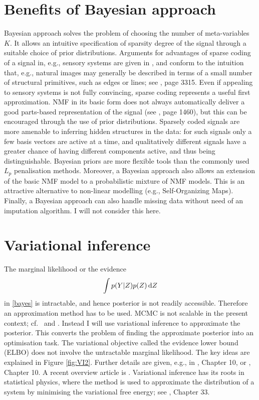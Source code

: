 \documentclass[]{article}
\begin{document}
\section{Benefits of Bayesian approach}

Bayesian approach solves the problem of choosing the number of meta-variables $K$. It allows an intuitive specification of sparsity degree of the signal through a suitable choice of prior distributions. Arguments for advantages of sparse coding of a signal in, e.g., sensory systems are given in \citet{field1994}, and conform to the intuition that, e.g., natural images may generally be described in terms of a small number of structural primitives, such as edges or lines; see \citet{olshausen1997}, page 3315. Even if appealing to sensory systems is not fully convincing, sparse coding represents a useful first approximation. NMF in its basic form does not always automatically deliver a good parts-based representation of the signal (see \citet{hoyer2004}, page 1460), but this can be encouraged through the use of prior distributions. Sparsely coded signals are more amenable to inferring hidden structures in the data: for such signals only a few basis vectors are active at a time, and qualitatively different signals have a greater chance of having different components active, and thus being distinguishable. Bayesian priors are more flexible tools than the commonly used $L_p$ penalisation methods. Moreover, a Bayesian approach also allows an extension of the basic NMF model to a probabilistic mixture of NMF models. This is an attractive alternative to non-linear modelling (e.g., Self-Organizing Maps). Finally, a Bayesian approach can also handle missing data without need of an imputation algorithm. I will not consider this here.

\section{Variational inference}

The marginal likelihood or the evidence
\[
\int p(Y|Z)p(Z) \odif{Z}
\]
in \eqref{bayes} is intractable, and hence posterior is not readily accessible. Therefore an approximation method has to be used. MCMC is not scalable in the present context; cf.\ \citet{kucukelbir2015} and \citet{kucukelbir2017}. Instead I will use variational inference to approximate the posterior. This converts the problem of finding the approximate posterior into an optimisation task. The variational objective called the evidence lower bound (ELBO) does not involve the untractable marginal likelihood. The key ideas are explained in Figure \ref{fig:VI2}. Further details are given, e.g., in \cite{bishop2006}, Chapter 10, or \citet{murphy2023}, Chapter 10. A recent overview article is \citet{blei2017}. Variational inference has its roots in statistical physics, where the method is used to approximate the distribution of a system by minimising the variational free energy; see \cite{mackay2003}, Chapter 33.
\end{document}
